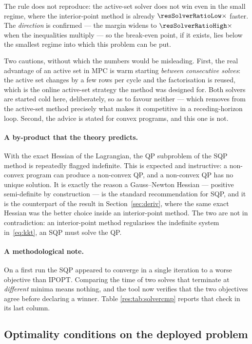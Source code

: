 \documentclass[11pt,a4paper]{article}
\begin{document}

The rule does not reproduce: the active-set solver does not win even in the small regime, where the
interior-point method is already $\resSolverRatioLow\times$ faster. The \emph{direction} is confirmed --- the
margin widens to $\resSolverRatioHigh\times$ when the inequalities multiply --- so the break-even point, if
it exists, lies below the smallest regime into which this problem can be put.

Two cautions, without which the numbers would be misleading. First, the real advantage of an active set in
MPC is warm starting \emph{between consecutive solves}: the active set changes by a few rows per cycle and
the factorisation is reused, which is the online active-set strategy the method was designed for. Both
solvers are started cold here, deliberately, so as to favour neither --- which removes from the active-set
method precisely what makes it competitive in a receding-horizon loop. Second, the advice is stated for
convex programs, and this one is not.

\paragraph{A by-product that the theory predicts.} With the exact Hessian of the Lagrangian, the QP
subproblem of the SQP method is repeatedly flagged indefinite. This is expected and instructive: a non-convex
program can produce a non-convex QP, and a non-convex QP has no unique solution. It is exactly the reason a
Gauss--Newton Hessian --- positive semi-definite by construction --- is the standard recommendation for SQP,
and it is the counterpart of the result in Section~\ref{sec:deriv}, where the same exact Hessian was the
better choice inside an interior-point method. The two are not in contradiction: an interior-point method
regularises the indefinite system in~\eqref{eq:kkt}, an SQP must solve the QP.

\paragraph{A methodological note.} On a first run the SQP appeared to converge in a single iteration to a
worse objective than IPOPT. Comparing the time of two solves that terminate at \emph{different} minima means
nothing, and the tool now verifies that the two objectives agree before declaring a winner. Table
\ref{res:tab:solvercmp} reports that check in its last column.

\subsection{Optimality conditions on the deployed problem}
\label{sec:kkt}
\end{document}
